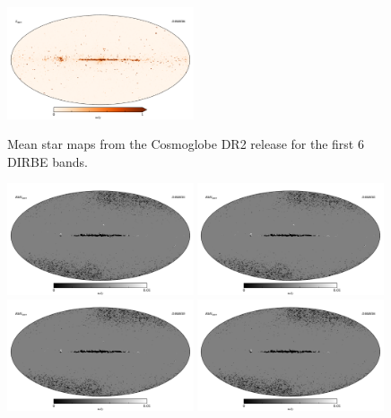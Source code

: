 \documentclass{aa}
\begin{document}
\begin{figure}
  \includegraphics[width=0.49\textwidth]{figs/starmaps/stars_mean_06.pdf} \\
  \caption{Mean star maps from the Cosmoglobe DR2 release for the first 6 DIRBE bands. }
  \label{fig:starsT}
\end{figure}

\begin{figure}
  \centering
  \includegraphics[width=0.49\textwidth]{figs/starmaps/stars_std_01.pdf}
  \includegraphics[width=0.49\textwidth]{figs/starmaps/stars_std_02.pdf} \\
  \includegraphics[width=0.49\textwidth]{figs/starmaps/stars_std_03.pdf}
  \includegraphics[width=0.49\textwidth]{figs/starmaps/stars_std_04.pdf} \\

\end{figure}
\end{document}
